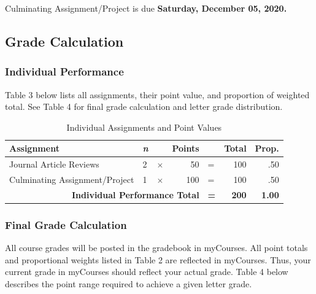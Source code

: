 \documentclass[
]{article}
\begin{document}
Culminating Assignment/Project is due \textbf{Saturday, December 05,
2020.}

\subsection{Grade Calculation}

\subsubsection{Individual Performance}

Table 3 below lists all assignments, their point value, and proportion
of weighted total. See Table 4 for final grade calculation and letter
grade distribution.

\begin{table}[H]
\centering
\caption{Individual Assignments and Point Values}
\vspace{3mm}
\label{points}
\begin{tabular}{lllrlrr}
\hline
\bf{Assignment} & \bf{\em{n}} &  & \bf{Points} &  & \bf{Total} & \bf{Prop.} \\
\hline
Journal Article Reviews & 2 & $\times$ & 50 & = & 100 & .50\\
Culminating Assignment/Project & 1 & $\times$ & 100 & = & 100 & .50 \\
\multicolumn{4}{r}{\bf{Individual Performance Total}} & {\bf{=}} & {\bf{200}} & {\bf{1.00}} \\
\hline
\end{tabular}
\label{points}
\end{table}

\subsubsection{Final Grade Calculation}

All course grades will be posted in the gradebook in myCourses. All
point totals and proportional weights listed in Table 2 are reflected in
myCourses. Thus, your current grade in myCourses should reflect your
actual grade. Table 4 below describes the point range required to
achieve a given letter grade.
\end{document}
